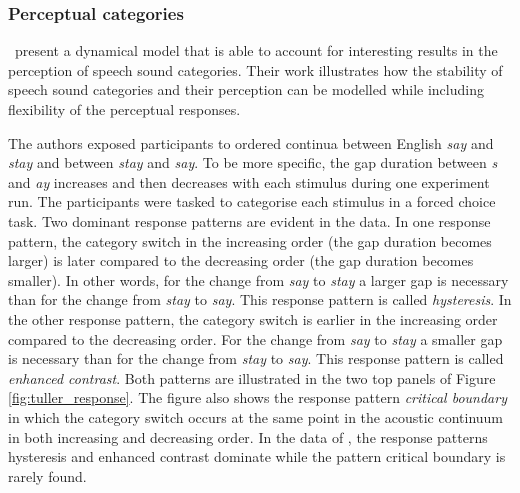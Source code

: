 \subsubsection{Perceptual categories}

\citet{Tulleretal1994} present a dynamical model that is able to account for interesting results in the perception of speech sound categories. Their work illustrates how the stability of speech sound categories and their perception can be modelled while including flexibility of the perceptual responses.

The authors exposed participants to ordered continua between English \emph{say} and \emph{stay} and between \emph{stay} and \emph{say}. To be more specific, the gap duration between \emph{s} and \emph{ay} increases and then decreases with each stimulus during one experiment run. The participants were tasked to categorise each stimulus in a forced choice task. Two dominant response patterns are evident in the data. In one response pattern, the category switch in the increasing order (the gap duration becomes larger) is later compared to the decreasing order (the gap duration becomes smaller). In other words, for the change from \emph{say} to \emph{stay} a larger gap is necessary than for the change from \emph{stay} to \emph{say}. This response pattern is called \emph{hysteresis}. In the other response pattern, the category switch is earlier in the increasing order compared to the decreasing order. For the change from \emph{say} to \emph{stay} a smaller gap is necessary than for the change from \emph{stay} to \emph{say}. This response pattern is called \emph{enhanced contrast}. Both patterns are illustrated in the two top panels of Figure \ref{fig:tuller_response}. The figure also shows the response pattern \emph{critical boundary} in which the category switch occurs at the same point in the acoustic continuum in both increasing and decreasing order. In the data of \citet{Tulleretal1994}, the response patterns hysteresis and enhanced contrast dominate while the pattern critical boundary is rarely found.

